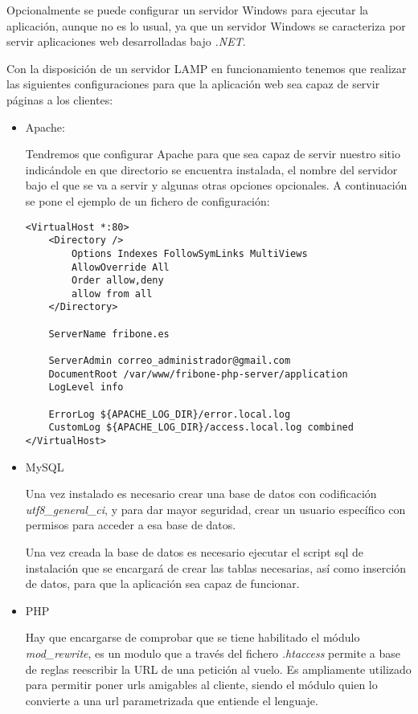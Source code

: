 Opcionalmente se puede configurar un servidor Windows para ejecutar la aplicación, aunque no es lo usual, ya que un servidor Windows se caracteriza por servir aplicaciones web desarrolladas bajo \emph{.NET}.

Con la disposición de un servidor LAMP en funcionamiento tenemos que realizar las siguientes configuraciones para que la aplicación web sea capaz de servir páginas a los clientes:

	\begin{itemize}
		\item Apache:

			Tendremos que configurar Apache para que sea capaz de servir nuestro sitio indicándole en que directorio se encuentra instalada, el nombre del servidor bajo el que se va a servir y algunas otras opciones opcionales. A continuación se pone el ejemplo de un fichero de configuración:

				\begin{lstlisting}
<VirtualHost *:80>
    <Directory />
        Options Indexes FollowSymLinks MultiViews
        AllowOverride All
        Order allow,deny
        allow from all
    </Directory>

	ServerName fribone.es

	ServerAdmin correo_administrador@gmail.com
	DocumentRoot /var/www/fribone-php-server/application
	LogLevel info

	ErrorLog ${APACHE_LOG_DIR}/error.local.log
	CustomLog ${APACHE_LOG_DIR}/access.local.log combined
</VirtualHost>
				\end{lstlisting} 

		\item MySQL

			Una vez instalado es necesario crear una base de datos con codificación \emph{utf8\_general\_ci}, y para dar mayor seguridad, crear un usuario específico con permisos para acceder a esa base de datos.

			Una vez creada la base de datos es necesario ejecutar el script sql de instalación que se encargará de crear las tablas necesarias, así como inserción de datos, para que la aplicación sea capaz de funcionar.

		\item PHP

			Hay que encargarse de comprobar que se tiene habilitado el módulo \emph{mod\_rewrite}, es un modulo que a través del fichero \emph{.htaccess} permite a base de reglas reescribir la URL de una petición al vuelo. Es ampliamente utilizado para permitir poner urls amigables al cliente, siendo el módulo quien lo convierte a una url parametrizada que entiende el lenguaje.


\end{itemize}
